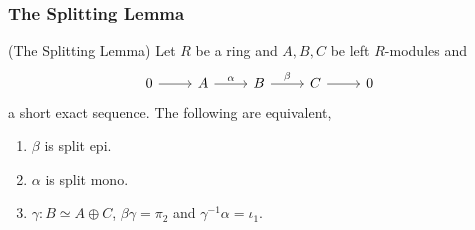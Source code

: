 \subsubsection{The Splitting Lemma}
\begin{lemma}(The Splitting Lemma)
    Let $R$ be a ring and $A,B,C$ be left $R$-modules and 
    $$
        \begin{tikzcd}
            0 \arrow[r] & A \arrow[r,"\alpha"] & B\arrow[r,"\beta"] & C \arrow[r] & 0
        \end{tikzcd}
    $$
    a short exact sequence. The following are equivalent,
    \begin{enumerate}
        \item $\beta$ is split epi.
        \item $\alpha$ is split mono.
        \item $\gamma: B\simeq A\oplus C$, $\beta\gamma=\pi_2$ and $\gamma^{-1}\alpha=\iota_1$.
    \end{enumerate}
\end{lemma}
